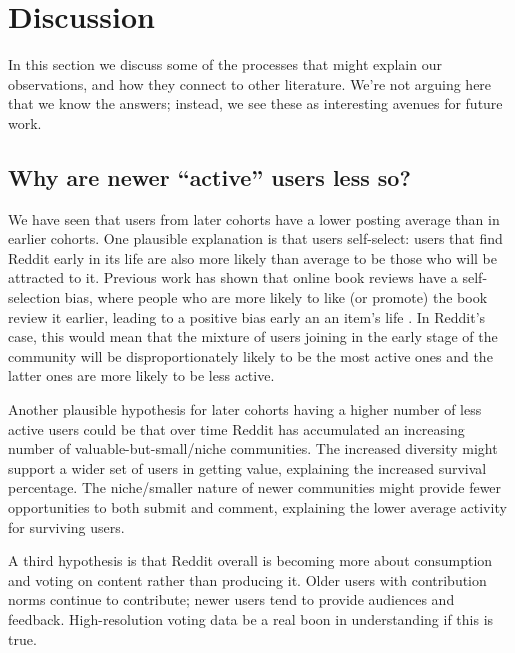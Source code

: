 
\section{Discussion}

In this section we discuss some of the processes that might explain our observations, and how they connect to other literature.  We're not arguing here that we know the answers; instead, we see these as interesting avenues for future work.  

\subsection{Why are newer ``active'' users less so?}

We have seen that users from later cohorts have a lower posting average than in earlier cohorts. 
One plausible explanation is that users self-select: users that find Reddit early in its life are also more likely than average to be those who will be attracted to it. Previous work has shown that online book reviews have a self-selection bias, where people who are more likely to like (or promote) the book review it earlier, leading to a positive bias early an an item's life \cite{Li2008}.  In Reddit's case, this would mean that the mixture of users joining in the early stage of the community will be disproportionately likely to be the most active ones and the latter ones are more likely to be less active. 

Another plausible hypothesis for later cohorts having a higher number of less active users could be that over time Reddit has accumulated an increasing number of valuable-but-small/niche communities.  The increased diversity might support a wider set of users in getting value, explaining the increased survival percentage.  The niche/smaller nature of newer communities might provide fewer opportunities to both submit and comment, explaining the lower average activity for surviving users. 

A third hypothesis is that Reddit overall is becoming more about consumption and voting on content rather than producing it.  Older users with contribution norms continue to contribute; newer users tend to provide audiences and feedback.  High-resolution voting data be a real boon in understanding if this is true.


